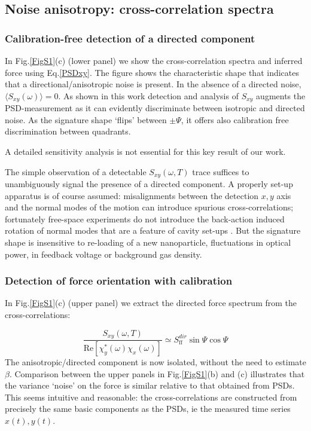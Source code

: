 \documentclass[twocolumn,english,notitlepage,superscriptaddress,nofootinbib]{revtex4-2}
\begin{document}
  \subsection{Noise anisotropy: cross-correlation spectra}

  \subsubsection{Calibration-free  detection of a directed component}
  In Fig.\ref{FigS1}(c) (lower panel) we show the cross-correlation spectra and inferred force using Eq.\ref{PSDxy}.
  The figure shows the characteristic shape that indicates that a directional/anisotropic noise is present.
 In the absence of a directed noise,  $\langle S_{xy}(\omega)\rangle=0$.
   As shown in this work detection and analysis of $S_{xy}$ augments the PSD-measurement as it can evidently discriminate between isotropic and directed noise.  As the signature shape `flips' between $\pm \Psi$,  it offers also calibration free
   discrimination between quadrants.

   A detailed sensitivity analysis is not essential for this key result of our work.

    The simple observation of a detectable $S_{xy}(\omega,T)$  trace suffices to unambiguously signal the presence of a directed component.  A properly set-up apparatus
   is of course assumed: misalignments between the detection $x,y$ axis and the normal modes of the motion
   can introduce spurious cross-correlations; fortunately free-space experiments do not introduce the back-action induced rotation of normal modes that are a feature of cavity set-ups \cite{Pontin2023}.  But the signature shape is insensitive to re-loading of a new nanoparticle,  fluctuations in optical power, in feedback voltage or background gas density.

    \subsubsection{Detection of force orientation with calibration}


 In Fig.\ref{FigS1}(c) (upper panel) we extract the directed force spectrum from the cross-correlations: 

 \begin{equation}
    \frac{S_{xy}(\omega,T)} {\text{Re}[\chi_y^*(\omega)\chi_x(\omega)]}  \simeq  S^{dir}_{\text{ff}} \sin \Psi \cos \Psi
    \label{PSxy}
 \end{equation}
The anisotropic/directed component is now isolated,  without the need to estimate $\beta$.
Comparison between the upper panels in Fig.\ref{FigS1}(b) and (c) 
illustrates that the variance `noise' on the force is similar relative to that obtained from PSDs.  This seems intuitive
 and reasonable: the cross-correlations are constructed from precisely the same basic components as the PSDs,
 ie the measured time series $x(t), y(t)$.  
 
\end{document}
